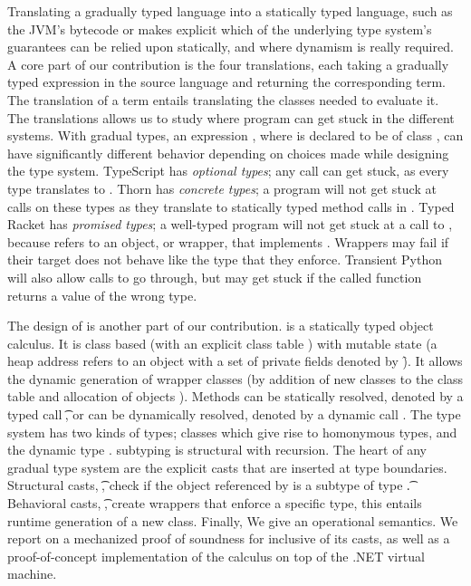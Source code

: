 \documentclass{tex/llncs}
\begin{document}
Translating a gradually typed language into a statically typed language,
such as the JVM's bytecode or \kafka makes explicit which of the underlying
type system's guarantees can be relied upon statically, and where dynamism
is really required. A core part of our contribution is the four translations, each
taking a gradually typed expression \HT\e\T in the source language and
returning the corresponding \kafka term. The translation of a term entails
translating the classes needed to evaluate it.  The translations allows us
to study where program can get stuck in the different systems.  With gradual
types, an expression \Call\x\m\e, where \x is declared to be of class \C,
can have significantly different behavior depending on choices made while
designing the type system. TypeScript has \emph{optional types}; any call
can get stuck, as every type translates to \any. Thorn has \emph{concrete
  types}; a program will not get stuck at calls on these types as they
translate to statically typed method calls in \kafka. Typed Racket has
\emph{promised types}; a well-typed program will not get stuck at a call to
\m, because \x refers to an object, or wrapper, that implements \m. Wrappers
may fail if their target does not behave like the type that they
enforce. Transient Python will also allow calls to go through, but may get
stuck if the called function returns a value of the wrong type.

The design of \kafka is another part of our contribution.  \kafka is a statically typed
object calculus.  It is class based (with an explicit class table \K) with
mutable state (a heap address \a refers to an object with a set of private
fields denoted by \f). It allows the dynamic generation of wrapper classes
(by addition of new classes to the class table \K and allocation of objects
\a).  Methods can be statically resolved, denoted by a typed call
\KCall\a\m\x\t\tp, or can be dynamically resolved, denoted by a dynamic call
\DynCall\a\m\x. The \kafka type system has two kinds of types; classes which
give rise to homonymous types, and the dynamic type \any.  \kafka subtyping
is structural with recursion.  The heart of any gradual type system are the
explicit casts that are inserted at type boundaries.  Structural casts,
\SubCast\t\a, check if the object referenced by \a is a subtype of type \t.
Behavioral casts, \BehCast\t\a, create wrappers that enforce a specific
type, this entails runtime generation of a new class. Finally, We give
\kafka an operational semantics. We report on a mechanized proof of
soundness for \kafka inclusive of its casts, as well as a proof-of-concept
implementation of the calculus on top of the .NET virtual machine.
\end{document}
